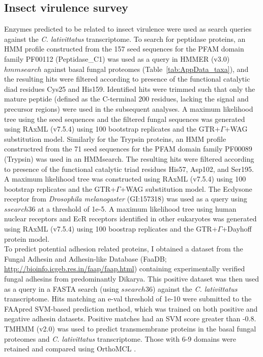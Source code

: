\subsection*{Insect virulence survey}
Enzymes predicted to be related to insect virulence were used as search queries against the \textit{C. lativittatus} transcriptome. To search for peptidase proteins, an HMM profile constructed from the 157 seed sequences for the PFAM domain family PF00112 (Peptidase\_C1) was used as a query in HMMER (v3.0) $hmmsearch$ against basal fungal proteomes (Table~\ref{tab:AppData_taxa}), and the resulting hits were filtered according to presence of the functional catalytic diad residues Cys25 and His159. Identified hits were trimmed such that only the mature peptide (defined as the C-terminal 200 residues, lacking the signal and precursor regions) were used in the subsequent analyses. A maximum likelihood tree using the seed sequences and the filtered fungal sequences was generated using RAxML (v7.5.4) using 100 bootstrap replicates and the GTR+$\Gamma$+WAG substitution model. Similarly for the Trypsin proteins, an HMM profile constructred from the 71 seed sequences for the PFAM domain family PF00089 (Trypsin) was used in an HMMsearch. The resulting hits were filtered according to presence of the functional catalytic triad residues His57, Asp102, and Ser195. A maximum likelihood tree was constructed using RAxML (v7.5.4) using 100 bootstrap replicates and the GTR+$\Gamma$+WAG substitution model. The Ecdysone receptor from \textit{Drosophila melanogaster} (GI:157318) was used as a query using $ssearch36$ at a threshold of 1e-5. A maximum likelihood tree using human nuclear receptors and EcR receptors identified in other eukaryotes was generated using RAxML (v7.5.4) \cite{Stamatakis2014} using 100 boostrap replicates and the GTR+$\Gamma$+Dayhoff protein model.\\
\indent To predict potential adhesion related proteins, I obtained a dataset from the Fungal Adhesin and Adhesin-like Database (FaaDB; \url{http://bioinfo.icgeb.res.in/faap/faap.html}) containing experimentally verified fungal adhesins from predominantly Dikarya. This positive dataset was then used as a query in a FASTA search (using $ssearch36$) against the \textit{C. lativittatus} transcriptome. Hits matching an e-val threshold of 1e-10 were submitted to the FAApred SVM-based prediction method, which was trained on both positive and negative adhesin datasets. Positive matches had an SVM score greater than -0.8.\\
\indent TMHMM (v2.0) \cite{Krogh2001} was used to predict transmembrane proteins in the basal fungal proteomes and \textit{C. lativittatus} transcriptome. Those with 6-9 domains were retained and compared using OrthoMCL \cite{Li2003}. \\

